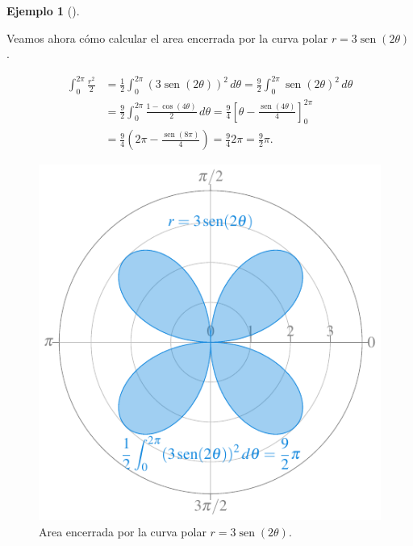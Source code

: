 \documentclass[
  a4paper,
]{scrreport}
\theoremstyle{definition}
\newtheorem{example}{Ejemplo}[chapter]
\theoremstyle{plain}
\theoremstyle{definition}
\theoremstyle{definition}
\theoremstyle{plain}
\theoremstyle{plain}
\theoremstyle{remark}
\begin{document}
\begin{example}[]\protect\hypertarget{exm-area-curva-polar}{}\label{exm-area-curva-polar}

Veamos ahora cómo calcular el area encerrada por la curva polar
\(r=3\operatorname{sen}(2\theta)\).

\begin{align*}
\int_0^{2\pi} \frac{r^2}{2} 
&= \frac{1}{2}\int_0^{2\pi} (3\operatorname{sen}(2\theta))^2\,d\theta
= \frac{9}{2}\int_0^{2\pi} \operatorname{sen}(2\theta)^2\,d\theta \\
&= \frac{9}{2}\int_0^{2\pi} \frac{1 - \cos(4\theta)}{2}\,d\theta 
= \frac{9}{4}\left[\theta - \frac{\operatorname{sen}(4\theta)}{4}\right]_0^{2\pi} \\
&= \frac{9}{4}\left(2\pi - \frac{\operatorname{sen}(8\pi)}{4}\right)
= \frac{9}{4}2\pi 
= \frac{9}{2}\pi.
\end{align*}

\begin{figure}[H]

{\centering \includegraphics{img/integrales/area-curva-polar.pdf}

}

\caption{Area encerrada por la curva polar
\(r=3\operatorname{sen}(2\theta)\).}

\end{figure}%

\end{example}
\end{document}
